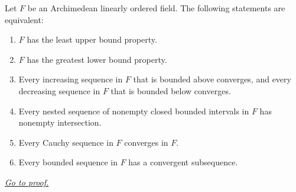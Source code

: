 \begin{theorem}
\label{thm:standard-completeness-equivalences}
Let $F$ be an Archimedean linearly ordered field.  The following statements are
equivalent:
\begin{enumerate}[label=(\roman*)]
  \item $F$ has the least upper bound property.
  \item $F$ has the greatest lower bound property.
  \item Every increasing sequence in $F$ that is bounded above converges, and
  every decreasing sequence in $F$ that is bounded below converges.
  \item Every nested sequence of nonempty closed bounded intervals in $F$ has
  nonempty intersection.
  \item Every Cauchy sequence in $F$ converges in $F$.
  \item Every bounded sequence in $F$ has a convergent subsequence.
\end{enumerate}

\smallskip
\noindent
\hyperref[prf:standard-completeness-equivalences]{\textit{Go to proof.}}
\end{theorem}
